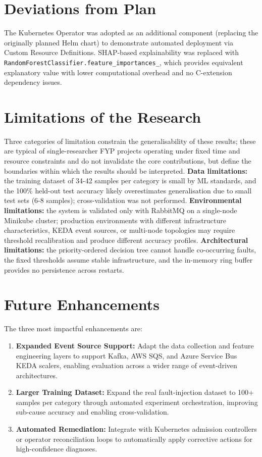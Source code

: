 \section{Deviations from Plan}
The Kubernetes Operator was adopted as an additional component (replacing the originally planned Helm chart) to demonstrate automated deployment via Custom Resource Definitions. SHAP-based explainability was replaced with \texttt{RandomForestClassifier.feature\_importances\_}, which provides equivalent explanatory value with lower computational overhead and no C-extension dependency issues.

\section{Limitations of the Research}
Three categories of limitation constrain the generalisability of these results; these are typical of single-researcher FYP projects operating under fixed time and resource constraints and do not invalidate the core contributions, but define the boundaries within which the results should be interpreted. \textbf{Data limitations:} the training dataset of 34-42 samples per category is small by ML standards, and the 100\% held-out test accuracy likely overestimates generalisation due to small test sets (6-8 samples); cross-validation was not performed. \textbf{Environmental limitations:} the system is validated only with RabbitMQ on a single-node Minikube cluster; production environments with different infrastructure characteristics, KEDA event sources, or multi-node topologies may require threshold recalibration and produce different accuracy profiles. \textbf{Architectural limitations:} the priority-ordered decision tree cannot handle co-occurring faults, the fixed thresholds assume stable infrastructure, and the in-memory ring buffer provides no persistence across restarts.

\section{Future Enhancements}
The three most impactful enhancements are:

\begin{enumerate}
    \item \textbf{Expanded Event Source Support:} Adapt the data collection and feature engineering layers to support Kafka, AWS SQS, and Azure Service Bus KEDA scalers, enabling evaluation across a wider range of event-driven architectures.
    \item \textbf{Larger Training Dataset:} Expand the real fault-injection dataset to 100+ samples per category through automated experiment orchestration, improving sub-cause accuracy and enabling cross-validation.
    \item \textbf{Automated Remediation:} Integrate with Kubernetes admission controllers or operator reconciliation loops to automatically apply corrective actions for high-confidence diagnoses.
\end{enumerate}


